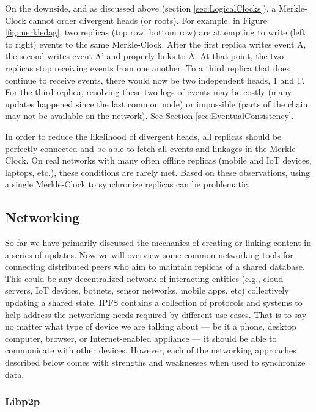 \documentclass{textile}
\begin{document}
On the downside, and as discussed above (section \ref{sec:LogicalClocks}), a Merkle-Clock cannot order divergent heads (or roots). For example, in Figure \ref{fig:merkledag}, two replicas (top row, bottom row) are attempting to write (left to right) events to the same Merkle-Clock. After the first replica writes event A, the second writes event A' and properly links to A. At that point, the two replicas stop receiving events from one another. To a third replica that does continue to receive events, there would now be two independent heads, 1 and 1'. For the third replica, resolving these two logs of events may be costly (many updates happened since the last common node) or impossible (parts of the chain may not be available on the network). See Section  \ref{sec:EventualConsistency}.

In order to reduce the likelihood of divergent heads, all replicas should be perfectly connected and be able to fetch all events and linkages in the Merkle-Clock. On real networks with many often offline replicas (mobile and IoT devices, laptops, etc.), these conditions are rarely met. Based on these observations, using a single Merkle-Clock to synchronize replicas can be problematic.

\FloatBarrier

\subsection{Networking}

So far we have primarily discussed the mechanics of creating or linking content in a series of updates. Now we will overview some common networking tools for connecting distributed peers who aim to maintain replicas of a shared database. This could be any decentralized network of interacting entities (e.g., cloud servers, IoT devices, botnets, sensor networks, mobile apps, etc) collectively updating a shared state. IPFS contains a collection of protocols and systems to help address the networking needs required by different use-cases. That is to say no matter what type of device we are talking about --- be it a phone, desktop computer, browser, or Internet-enabled appliance --- it should be able to communicate with other devices. However, each of the networking approaches described below comes with strengths and weaknesses when used to synchronize data.

\subsubsection{Libp2p}
\end{document}
